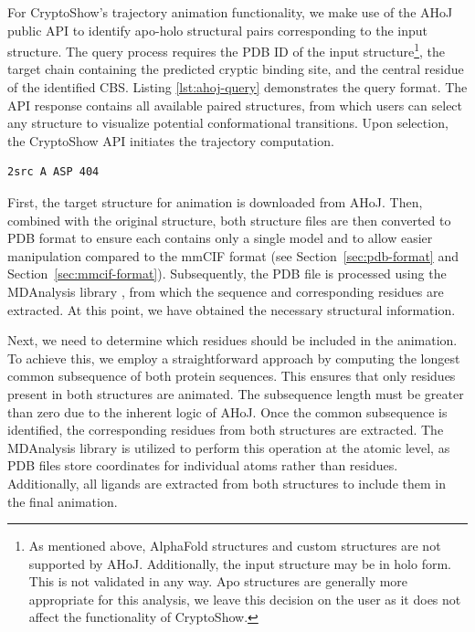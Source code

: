 For CryptoShow's trajectory animation functionality, we make use of the AHoJ public API to identify apo-holo structural pairs corresponding to the input structure. The query process requires the PDB ID of the input structure\footnote{As mentioned above, AlphaFold structures and custom structures are not supported by AHoJ. Additionally, the input structure may be in holo form. This is not validated in any way. Apo structures are generally more appropriate for this analysis, we leave this decision on the user as it does not affect the functionality of CryptoShow.}, the target chain containing the predicted cryptic binding site, and the central residue of the identified CBS. Listing \ref{lst:ahoj-query} demonstrates the query format. The API response contains all available paired structures, from which users can select any structure to visualize potential conformational transitions. Upon selection, the CryptoShow API initiates the trajectory computation.

\begin{lstlisting}[caption={Sample query format for the AHoJ tool, specifically the 2SRC protein structure (Crystal Structure of Human Tyro\-sine-Protein Kinase C-SRC, in Complex with AMP-PNP), chain A, aspartic acid residue at position 404}, label={lst:ahoj-query}]
    2src A ASP 404
\end{lstlisting}

First, the target structure for animation is downloaded from AHoJ. Then, combined with the original structure, both structure files are then converted to PDB format to ensure each contains only a single model and to allow easier manipulation compared to the mmCIF format (see Section~\ref{sec:pdb-format} and Section~\ref{sec:mmcif-format}). Subsequently, the PDB file is processed using the MDAnalysis library \cite{gowers2019mdanalysis}, from which the sequence and corresponding residues are extracted. At this point, we have obtained the necessary structural information.

Next, we need to determine which residues should be included in the animation. To achieve this, we employ a straightforward approach by computing the longest common subsequence of both protein sequences. This ensures that only residues present in both structures are animated. The subsequence length must be greater than zero due to the inherent logic of AHoJ. Once the common subsequence is identified, the corresponding residues from both structures are extracted. The MDAnalysis library is utilized to perform this operation at the atomic level, as PDB files store coordinates for individual atoms rather than residues. Additionally, all ligands are extracted from both structures to include them in the final animation.

